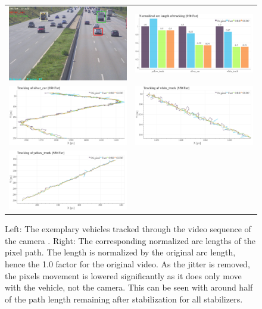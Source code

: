 \begin{figure}[!ht]
  \centering
  \begin{tabular}{cc}
    \includegraphics[width=0.45\linewidth]{diagrams/object_tracking/s50_s_far/frame.png}    &  
    \includegraphics[width=0.475\linewidth]{diagrams/object_tracking/s50_s_far/arcs.png}    \\

    \includegraphics[width=0.475\linewidth]{diagrams/object_tracking/s50_s_far/silver_car.png}    &  
    \includegraphics[width=0.475\linewidth]{diagrams/object_tracking/s50_s_far/white_truck.png}    \\  
    \includegraphics[width=0.475\linewidth]{diagrams/object_tracking/s50_s_far/yellow_truck.png}   
  \end{tabular}
  \caption{Left: 
  The exemplary vehicles tracked through the video sequence of the camera . 
  Right:
  The corresponding normalized arc lengths of the pixel path. 
  The length is normalized by the original arc length, hence the 1.0 factor for the original video. 
  As the jitter is removed, the pixels movement is lowered significantly as it does only move with the vehicle, not the camera.
  This can be seen with around half of the path length remaining after stabilization for all stabilizers.
  }
  \label{fig:object_tracking_appendix_s50_s_far}
\end{figure}




